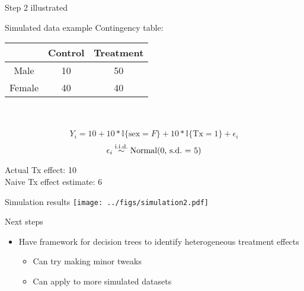 \documentclass{beamer}
\def\mI{\mathbb I}\def\mN{\mathbb N}\def\mP{\mathbb P}\def\mR{\mathbb R}
\def\iid{\stackrel{\mbox{\scriptsize i.i.d.}}{\sim}}
\begin{document}
\begin{frame}{Step 2 illustrated}
\end{frame}

\begin{frame}{Simulated data example}
Contingency table:
\begin{center}
\begin{tabular}{c|c|c|}
        & Control   & Treatment\\
        \hline
Male    & 10        & 50\\
\hline
Female  & 40        & 40\\
\hline
\end{tabular}\\~\\
$$Y_i = 10 + 10*\mI\{\mbox{sex} = F\} + 10*\mI\{\mbox{Tx} = 1\} + \epsilon_i$$
$$\epsilon_i \iid \mbox{Normal(0, \mbox{s.d.} = 5)}$$
\end{center}
Actual Tx effect: 10\\
Naive Tx effect estimate: 6
\end{frame}

\begin{frame}{Simulation results}
\centering
\texttt{[image: ../figs/simulation2.pdf]}
\end{frame}

\begin{frame}{Next steps}
\begin{itemize}
\item Have framework for decision trees to identify heterogeneous treatment
    effects
    \begin{itemize}
    \item Can try making minor tweaks
    \item Can apply to more simulated datasets
    \end{itemize}
\end{itemize}
\end{frame}
\end{document}
